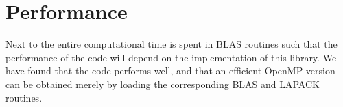 
\section{Performance}

Next to the entire computational time is spent in BLAS routines such that the performance of the code will depend on the  implementation of this library. We have found that the code performs well, and that  an efficient  OpenMP  version  can be obtained merely by   loading the corresponding BLAS and LAPACK routines. 

